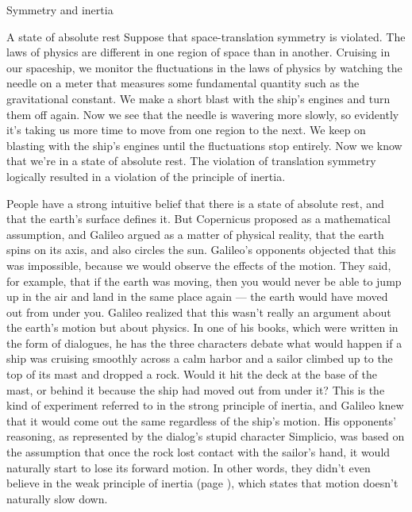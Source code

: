 \begin{envsubsection}{Symmetry and inertia}
\begin{eg}{A state of absolute rest}\label{eg:absoluterest}
Suppose that space-translation symmetry is violated. The laws of phys\-ics are different
in one region of space than in another. Cruising in our spaceship, we monitor the
fluctuations in the laws of physics by watching the needle on a meter that measures
some fundamental quantity such as the gravitational constant. We make a short blast
with the ship's engines and turn them off again. Now we see that the needle is wavering
more slowly, so evidently it's taking us more time to move from one region to the next.
We keep on blasting with the ship's engines until the fluctuations stop entirely. Now
we know that we're in a state of absolute rest. The violation of translation
symmetry logically resulted in a violation of the principle of inertia.
\end{eg}


People have a strong intuitive belief that there is a state of absolute rest,
and that the earth's surface defines it. But Copernicus proposed as a mathematical
assumption, and Galileo argued as a matter of physical reality, that the earth spins
on its axis, and also circles the sun. Galileo's opponents objected that this was
impossible, because we would observe the effects of the motion. They said, for example,
that if the earth was moving, then you would never be able to jump up in the air and
land in the same place again --- the earth would have moved out from under you.
Galileo realized that this wasn't really an argument about the earth's motion but
about physics. In one of his books, which were written in the form of dialogues, he has
the three characters debate what would happen if a ship was cruising smoothly across
a calm harbor and a sailor climbed up to the top of its mast and dropped a rock.
Would it hit the deck at the base of the mast, or behind it because the ship had moved out from
under it? This is the kind of experiment referred to in the strong principle of
inertia, and Galileo knew that it would come out the same regardless of the ship's
motion. His opponents' reasoning, as represented by the dialog's stupid character
Simplicio, was based on the assumption that once the rock lost contact with the sailor's
hand, it would naturally start to lose its forward motion. In other words,
they didn't even believe in the weak principle of inertia
(page \pageref{weak-principle-of-inertia}), which states that motion doesn't naturally
slow down.


\end{envsubsection}
